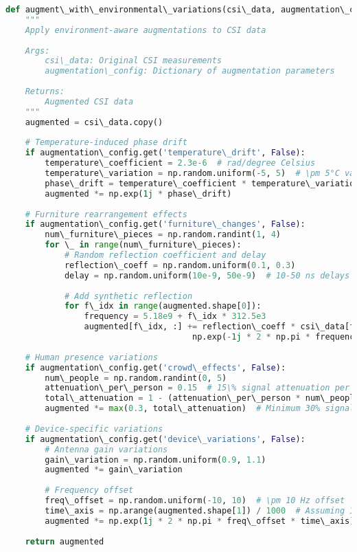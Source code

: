 \documentclass[journal]{IEEEtran}
\begin{document}
\begin{lstlisting}[language=Python, caption=Environment-Aware Data Augmentation]
def augment\_with\_environmental\_variations(csi\_data, augmentation\_config):
    """
    Apply environment-aware augmentations to CSI data
    
    Args:
        csi\_data: Original CSI measurements
        augmentation\_config: Dictionary of augmentation parameters
    
    Returns:
        Augmented CSI data
    """
    augmented = csi\_data.copy()
    
    # Temperature-induced phase drift
    if augmentation\_config.get('temperature\_drift', False):
        temperature\_coefficient = 2.3e-6  # rad/degree Celsius
        temperature\_variation = np.random.uniform(-5, 5)  # \pm 5°C variation
        phase\_drift = temperature\_coefficient * temperature\_variation * np.arange(csi\_data.shape[1])
        augmented *= np.exp(1j * phase\_drift)
    
    # Furniture rearrangement effects
    if augmentation\_config.get('furniture\_changes', False):
        num\_furniture\_pieces = np.random.randint(1, 4)
        for \_ in range(num\_furniture\_pieces):
            # Random reflection coefficient and delay
            reflection\_coeff = np.random.uniform(0.1, 0.3)
            delay = np.random.uniform(10e-9, 50e-9)  # 10-50 ns delays
            
            # Add synthetic reflection
            for f\_idx in range(augmented.shape[0]):
                frequency = 5.18e9 + f\_idx * 312.5e3
                augmented[f\_idx, :] += reflection\_coeff * csi\_data[f\_idx, :] * \
                                      np.exp(-1j * 2 * np.pi * frequency * delay)
    
    # Human presence variations
    if augmentation\_config.get('crowd\_effects', False):
        num\_people = np.random.randint(0, 5)
        attenuation\_per\_person = 0.15  # 15\% signal attenuation per person
        total\_attenuation = 1 - (attenuation\_per\_person * num\_people)
        augmented *= max(0.3, total\_attenuation)  # Minimum 30% signal strength
    
    # Device-specific variations
    if augmentation\_config.get('device\_variations', False):
        # Antenna gain variations
        gain\_variation = np.random.uniform(0.9, 1.1)
        augmented *= gain\_variation
        
        # Frequency offset
        freq\_offset = np.random.uniform(-10, 10)  # \pm 10 Hz offset
        time\_axis = np.arange(augmented.shape[1]) / 1000  # Assuming 1kHz sampling
        augmented *= np.exp(1j * 2 * np.pi * freq\_offset * time\_axis)
    
    return augmented
\end{lstlisting}
\end{document}
